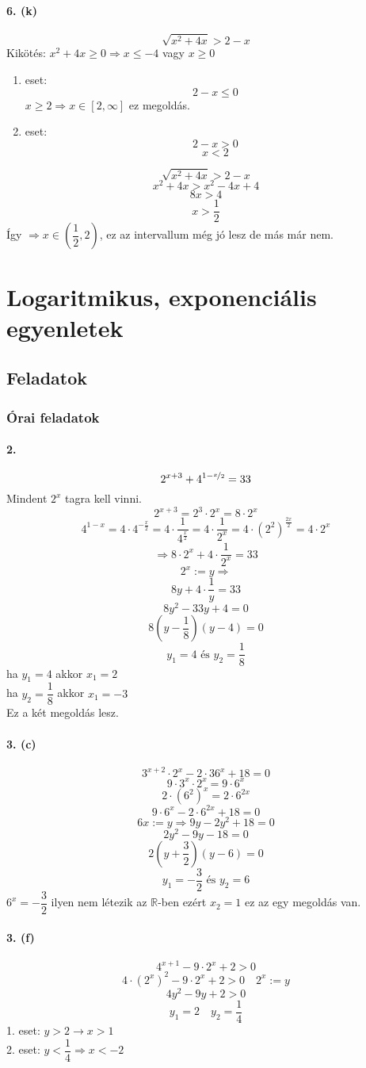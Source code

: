 \documentclass[12pt,a4paper,fleqn]{article}
\newcommand{\myparagraph}[1]{\paragraph{#1}\mbox{}}
\begin{document}
\myparagraph{6. (k)}
\[ \sqrt{x^2+4x} > 2-x \]
Kikötés: $ x^2 +4x \geq 0 \Rightarrow x \leq -4$ vagy $x \geq 0$
\begin{enumerate}
  \item eset:
    \[ 2-x \leq 0 \]
    $x \geq 2 \Rightarrow x \in [2, \infty]$ ez megoldás.
  \item eset:
    \[ 2-x > 0 \]
    \[ x < 2 \]
\end{enumerate}
\[ \sqrt{x^2+4x} > 2-x \]
\[ x^2 + 4x > x^2 - 4x +4 \]
\[ 8x > 4 \]
\[ x > \dfrac{1}{2} \]
Így $ \Rightarrow x \in \left(\dfrac{1}{2}, 2\right)$, ez az intervallum még jó lesz de más már nem.



\section{Logaritmikus, exponenciális egyenletek}
\setcounter{subsection}{1}
\subsection{Feladatok}
\subsubsection{Órai feladatok}


\myparagraph{2.}
\[ 2^{x+3} + 4^{1-\nicefrac{x}{2}} = 33 \]
Mindent $2^x$ tagra kell vinni.
\[ 2^{x+3} = 2^3 \cdot 2^x = 8 \cdot 2^x \]
\[ 4^{1-x} = 4 \cdot 4^{-\frac{x}{2}} = 4 \cdot \dfrac{1}{4^{\frac{x}{2}}} =
  4 \cdot \dfrac{1}{2^x} = 4 \cdot (2^2)^{\frac{2x}{2}} = 4 \cdot 2^x \]
\[ \Rightarrow 8 \cdot 2^x + 4 \cdot \dfrac{1}{2^x} = 33 \]
\[ 2^x := y \Rightarrow \]
\[ 8y + 4 \cdot \dfrac{1}{y} = 33 \]
\[ 8y^2 - 33y + 4 = 0 \]
\[ 8(y-\dfrac{1}{8})(y-4) =0 \]
\[ y_1 = 4 \text{ és } y_2 = \dfrac{1}{8} \]
ha $y_1 = 4$ akkor $x_1 = 2$ \\
ha $y_2 = \dfrac{1}{8}$ akkor $x_1 = -3$ \\
Ez a két megoldás lesz.


\myparagraph{3. (c)}
\[ 3^{x+2} \cdot 2^x - 2 \cdot 36^x + 18 = 0 \]
\[ 9 \cdot 3^x \cdot 2^x = 9 \cdot 6^x \]
\[ 2 \cdot (6^2)^x= 2 \cdot 6^{2x} \]
\[ 9 \cdot 6^x - 2 \cdot 6^{2x} + 18 = 0 \]
\[ 6x := y \Rightarrow 9y - 2y^2 + 18 = 0 \]
\[ 2y^2 - 9y - 18 = 0 \]
\[ 2(y+\dfrac{3}{2})(y-6) = 0 \]
\[ y_1=-\dfrac{3}{2} \text{ és } y_2 = 6 \]
$ 6^x = -\dfrac{3}{2}$ ilyen nem létezik az $\mathbb{R}$-ben ezért $ x_2 = 1 $
  ez az egy megoldás van.


\myparagraph{3. (f)}
\[ 4^{x+1} - 9 \cdot 2^x + 2 > 0 \]
\[ 4 \cdot (2^x)^2 - 9 \cdot 2^x + 2 > 0 \quad 2^x:=y\]
\[ 4y^2 - 9y + 2 > 0 \]
\[ y_1 = 2 \quad y_2 = \dfrac{1}{4} \]
1. eset: $y > 2 \rightarrow x > 1$ \\
2. eset: $y < \dfrac{1}{4} \Rightarrow x < -2 $
\end{document}
